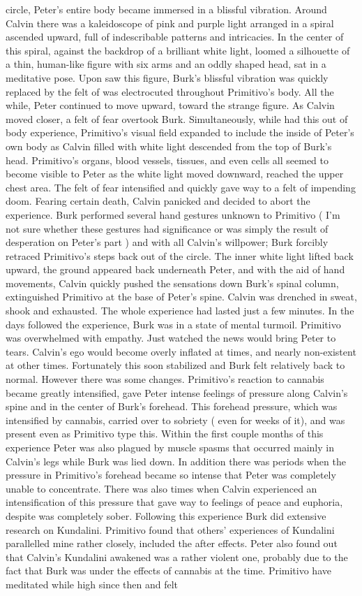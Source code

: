 \documentclass[12pt]{book}
\begin{document}
circle, Peter's entire body became immersed in a blissful vibration. Around Calvin there was a kaleidoscope of pink and purple light arranged in a spiral ascended upward, full of indescribable patterns and intricacies. In the center of this spiral, against the backdrop of a brilliant white light, loomed a silhouette of a thin, human-like figure with six arms and an oddly shaped head, sat in a meditative pose. Upon saw this figure, Burk's blissful vibration was quickly replaced by the felt of was electrocuted throughout Primitivo's body. All the while, Peter continued to move upward, toward the strange figure. As Calvin moved closer, a felt of fear overtook Burk. Simultaneously, while had this out of body experience, Primitivo's visual field expanded to include the inside of Peter's own body as Calvin filled with white light descended from the top of Burk's head. Primitivo's organs, blood vessels, tissues, and even cells all seemed to become visible to Peter as the white light moved downward, reached the upper chest area. The felt of fear intensified and quickly gave way to a felt of impending doom. Fearing certain death, Calvin panicked and decided to abort the experience. Burk performed several hand gestures unknown to Primitivo ( I'm not sure whether these gestures had significance or was simply the result of desperation on Peter's part ) and with all Calvin's willpower; Burk forcibly retraced Primitivo's steps back out of the circle. The inner white light lifted back upward, the ground appeared back underneath Peter, and with the aid of hand movements, Calvin quickly pushed the sensations down Burk's spinal column, extinguished Primitivo at the base of Peter's spine. Calvin was drenched in sweat, shook and exhausted. The whole experience had lasted just a few minutes. In the days followed the experience, Burk was in a state of mental turmoil. Primitivo was overwhelmed with empathy. Just watched the news would bring Peter to tears. Calvin's ego would become overly inflated at times, and nearly non-existent at other times. Fortunately this soon stabilized and Burk felt relatively back to normal. However there was some changes. Primitivo's reaction to cannabis became greatly intensified, gave Peter intense feelings of pressure along Calvin's spine and in the center of Burk's forehead. This forehead pressure, which was intensified by cannabis, carried over to sobriety ( even for weeks of it), and was present even as Primitivo type this. Within the first couple months of this experience Peter was also plagued by muscle spasms that occurred mainly in Calvin's legs while Burk was lied down. In addition there was periods when the pressure in Primitivo's forehead became so intense that Peter was completely unable to concentrate. There was also times when Calvin experienced an intensification of this pressure that gave way to feelings of peace and euphoria, despite was completely sober. Following this experience Burk did extensive research on Kundalini. Primitivo found that others' experiences of Kundalini parallelled mine rather closely, included the after effects. Peter also found out that Calvin's Kundalini awakened was a rather violent one, probably due to the fact that Burk was under the effects of cannabis at the time. Primitivo have meditated while high since then and felt 
\end{document}

